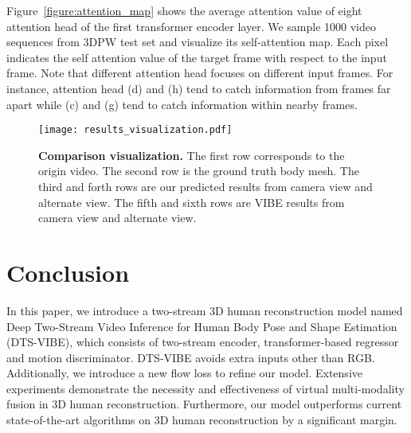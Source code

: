 \documentclass[10pt,twocolumn,letterpaper]{article}
\begin{document}
Figure~\ref{figure:attention_map} shows the average attention value of eight attention head of the first transformer encoder layer. We sample 1000 video sequences from 3DPW test set and visualize its self-attention map. Each pixel indicates the self attention value of the target frame with respect to the input frame. Note that different attention head focuses on different input frames. For instance, attention head (d) and (h) tend to catch information from frames far apart while (c) and (g) tend to catch information within nearby frames. 






\begin{figure*}[t]
\centering
\texttt{[image: results\_visualization.pdf]}
\vspace{-2pt}
\caption{\textbf{Comparison visualization.} The first row corresponds to the origin video. The second row is the ground truth body mesh. The third and forth rows are our predicted results from camera view and alternate view. The fifth and sixth rows are VIBE results from camera view and alternate view.}
\label{comparison_visualization}

\vspace{-8pt}
\end{figure*}
\section{Conclusion}
In this paper, we introduce a two-stream 3D human reconstruction model named Deep Two-Stream Video Inference for Human Body Pose and Shape Estimation (DTS-VIBE), which consists of two-stream encoder, transformer-based regressor and motion discriminator. DTS-VIBE avoids extra inputs other than RGB. Additionally, we introduce a new flow loss to refine our model. Extensive experiments demonstrate the necessity and effectiveness of virtual multi-modality fusion in 3D human reconstruction. Furthermore, our model outperforms current state-of-the-art algorithms on 3D human reconstruction by a signiﬁcant margin.
\end{document}
